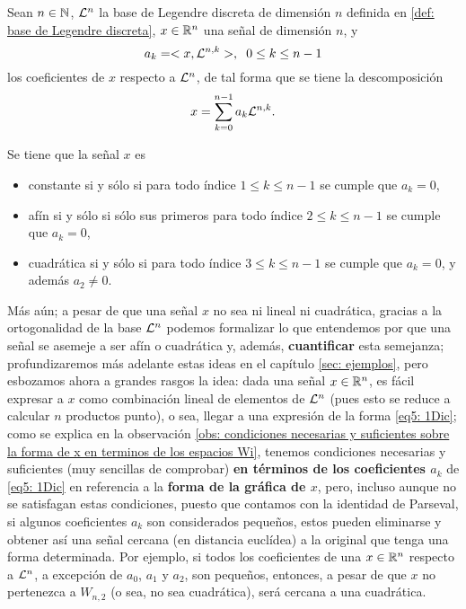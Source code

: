 \begin{obs} 
\label{obs: condiciones necesarias y suficientes sobre la forma de x en terminos de los espacios Wi}
Sean $n \in \mathbb{N}$, $\mathcal{L}^{n}$
la base de Legendre discreta de dimensión $n$
definida en 
\ref{def: base de Legendre discreta}, 
$x \in \mathbb{R}^{n}$ una señal de dimensión $n$, y
\[
a_{k}=<x, \mathcal{L}^{n,k}>, \hspace{0.2cm} 0 \leq k \leq n-1
\]
los coeficientes de $x$
respecto
a $\mathcal{L}^{n}$,
de tal forma que se tiene la descomposición
\begin{equation}
\label{eq5: 1Dic}
x=\sum\limits_{k=0}^{n-1}a_{k}\mathcal{L}^{n,k}.
\end{equation}


Se tiene que la señal $x$ es
 
\begin{itemize}
\item constante si y sólo si para todo índice
$1 \leq k \leq n-1$ se cumple que $a_{k}=0$,

\item afín si y sólo si sólo sus primeros
para todo índice
$2 \leq k \leq n-1$ se cumple que $a_{k}=0$,

\item cuadrática si y sólo si 
para todo índice
$3 \leq k \leq n-1$ se cumple que $a_{k}=0$,
y además $a_{2} \neq 0$.
\end{itemize}
\end{obs}

Más aún; a pesar de que
una señal $x$ no sea ni lineal ni cuadrática, gracias a la 
ortogonalidad de la base
$\mathcal{L}^{n}$ podemos formalizar lo que
entendemos por que una señal se asemeje a ser
afín o cuadrática y, además, \textbf{cuantificar} esta semejanza;
profundizaremos más adelante estas ideas
en el capítulo \ref{sec: ejemplos},
pero esbozamos ahora a grandes rasgos la idea:
dada una señal $x \in \mathbb{R}^{n}$, es fácil expresar
a $x$ como combinación lineal
de elementos de $\mathcal{L}^{n}$ 
(pues esto se reduce a calcular $n$ productos punto),
o sea, llegar a una expresión de la forma
\eqref{eq5: 1Dic}; como se explica en 
la observación 
\ref{obs: condiciones necesarias y suficientes sobre la forma de x en terminos de los espacios Wi}, tenemos condiciones necesarias y suficientes
(muy sencillas de comprobar)
\textbf{en términos de los coeficientes $a_{k}$}
de \eqref{eq5: 1Dic} en referencia a la \textbf{forma
de la gráfica de $x$}, pero, incluso aunque no se satisfagan
estas condiciones,
puesto que contamos con la identidad de Parseval, si
algunos coeficientes $a_{k}$ son considerados pequeños, estos
pueden eliminarse y obtener así una señal cercana (en distancia
euclídea) a la original que tenga una forma determinada.
Por ejemplo, si todos los coeficientes de una 
$x \in \mathbb{R}^{n}$ respecto a $\mathcal{L}^{n}$, a excepción de 
$a_{0}$, $a_{1}$ y $a_{2}$, son pequeños, entonces, a pesar de que
$x$ no pertenezca a $W_{n,2}$ (o sea, no sea cuadrática),
será cercana a una cuadrática.


